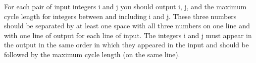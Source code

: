 For each pair of input integers i and j you should output  i, j, and the maximum cycle length for integers between and  including i and j. These three numbers should be separated by at least one space with all three numbers on one line and with one line of output for each line of input. The integers i and j must appear in the output in the same order in which they appeared in the input and should be followed by the maximum cycle length (on the same line).